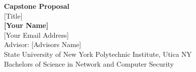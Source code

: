 \documentclass{article}
\begin{document}
	\begin{center}
    
    
		\LARGE{\textbf{Capstone Proposal}} \\
        \vspace{1em}
        \Large{[Title]} \\
        \vspace{1em}
        \normalsize\textbf{[Your Name]} \\
        \normalsize{[Your Email Address]} \\
        \vspace{1em}
        \normalsize{Advisor: [Advisors Name]} \\
        \vspace{1em}
        \normalsize{State University of New York Polytechnic Institute, Utica NY} \\
        \normalsize{Bachelors of Science in Network and Computer Security}
     
	\end{center}
\end{document}

